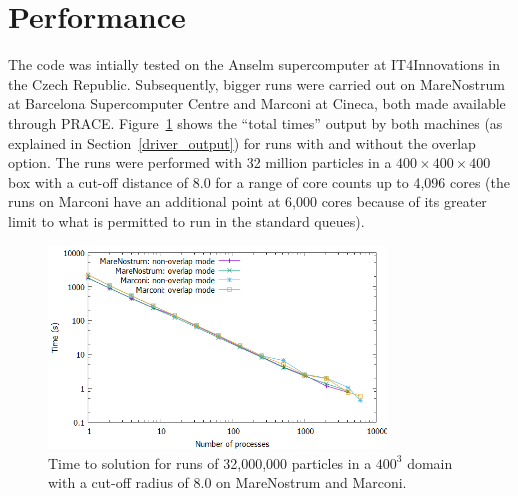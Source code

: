 \documentclass[paper=a4, fontsize=11pt,bibtotoc]{scrartcl}		%
\begin{document}

\section{Performance} \label{SEC_Results}

The code was intially tested on the Anselm supercomputer at IT4Innovations in the Czech Republic. Subsequently, bigger runs were carried out on MareNostrum at Barcelona Supercomputer Centre and Marconi at Cineca, both made available through PRACE. Figure~\ref{FIG_strong} shows the ``total times'' output by both machines (as explained in Section~\ref{driver_output}) for runs with and without the overlap option. The runs were performed with 32 million particles in a $400\times 400\times 400$ box with a cut-off distance of 8.0 for a range of core counts up to 4,096 cores (the runs on Marconi have an additional point at 6,000 cores because of its greater limit to what is permitted to run in the standard queues). 
\begin{figure}
	\centering
	\includegraphics[width=0.8\textwidth]{FIGS/exaMD_strong_scaling_plot.png}
	\caption{Time to solution for runs of 32,000,000 particles in a $400^3$ domain with a cut-off radius of 8.0 on MareNostrum and Marconi.}
	\label{FIG_strong}
\end{figure}
\end{document}
